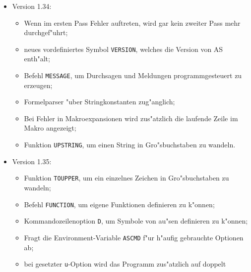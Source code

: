 \documentclass[12pt,a4paper,twoside]{report}
\newcommand{\tty}[1]{{\tt #1}}
\begin{document}
{\begin{itemize}
{\begin{itemize}
      \item{Die Befehle \tty{TITLE}, \tty{PRTINIT}, \tty{PRTEXIT},
            \tty{ERROR}, \tty{WARNING} und \tty{FATAL} erwarten jetzt
	    einen Stringausdruck als Parameter, Konstanten
            m"ussen demzufolge nicht mehr in Hochkommas, sondern in
            G"ansef"u"schen eingeschlossen werden. Analoges gilt f"ur \tty{DB},
            \tty{DC.B} und \tty{BYT};}
      \item{Befehl \tty{ALIGN} zur Ausrichtung des Programmz"ahlers bei Intel-
            Prozessoren;}
      \item{Befehl \tty{LISTING}, um die Erzeugung eines Listings ein- und
            ausschalten zu k"onnen;}
      \item{Befehl \tty{CHARSET} zur Definition eigener Zeichens"atze.}
      \end{itemize}}
\item{Version 1.34:
      \begin{itemize}
      \item{Wenn im ersten Pass Fehler auftreten, wird gar kein zweiter
            Pass mehr durchgef"uhrt;}
      \item{neues vordefiniertes Symbol \tty{VERSION}, welches die Version von
            AS enth"alt;}
      \item{Befehl \tty{MESSAGE}, um Durchsagen und Meldungen programmgesteuert
            zu erzeugen;}
      \item{Formelparser "uber Stringkonstanten zug"anglich;}
      \item{Bei Fehler in Makroexpansionen wird zus"atzlich die laufende
            Zeile im Makro angezeigt;}
      \item{Funktion \tty{UPSTRING}, um einen String in Gro"sbuchstaben zu
            wandeln.}
      \end{itemize}}
\item{Version 1.35:
      \begin{itemize}
      \item{Funktion \tty{TOUPPER}, um ein einzelnes Zeichen in Gro"sbuchstaben
            zu wandeln;}
      \item{Befehl \tty{FUNCTION}, um eigene Funktionen definieren zu k"onnen;}
      \item{Kommandozeilenoption \tty{D}, um Symbole von au"sen definieren zu
            k"onnen;}
      \item{Fragt die Environment-Variable \tty{ASCMD} f"ur h"aufig gebrauchte
            Optionen ab;}
      \item{bei gesetzter \tty{u}-Option wird das Programm zus"atzlich auf doppelt
}
\end{itemize}}
\end{itemize}}
\end{document}
